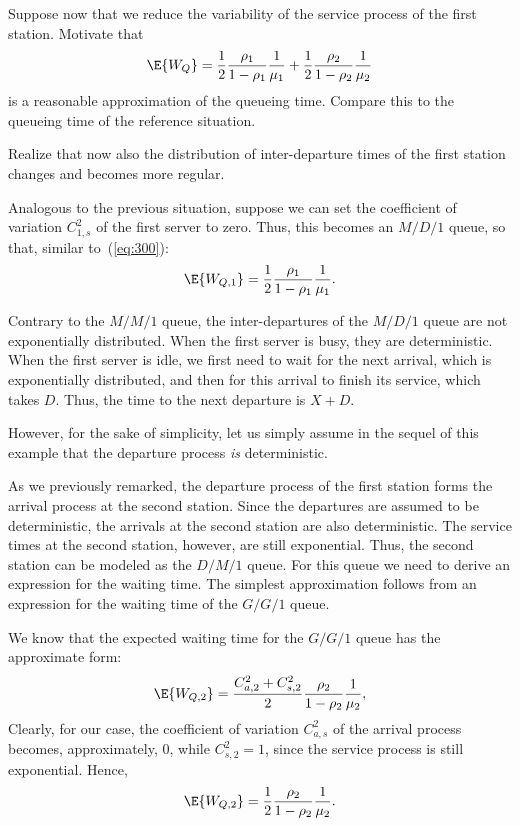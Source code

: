 \begin{exercise}
Suppose now that we reduce the variability of the service process of the first station.
Motivate that 
\begin{equation*}
  \E{W_Q}= \frac12\frac{\rho_1}{1-\rho_1} \frac1{\mu_1} +
  \frac12\frac{\rho_2}{1-\rho_2} \frac1{\mu_2}
\end{equation*}
is a reasonable approximation of the queueing time. Compare this to the queueing time of the reference situation.
  \begin{hint}
    Realize that now also the distribution of inter-departure times of the first station changes and becomes more regular.
  \end{hint}
  \begin{solution}
Analogous to the previous situation, suppose we can set the coefficient of variation
$C_{1,s}^2$ of the first server to zero. Thus, this becomes an $M/D/1$
queue, so that, similar to~(\ref{eq:300}):
\begin{equation*}
\E{W_{Q,1}} = \frac{1}2\frac{\rho_1}{1-\rho_1} \frac1{\mu_1}.
\end{equation*}

Contrary to the $M/M/1$ queue, the inter-departures of the $M/D/1$
queue are not exponentially distributed. When the first
server is busy, they are deterministic. When the first server is idle, we first
need to wait for the next arrival, which is exponentially distributed, and then for this arrival to finish its service, which
takes $D$. Thus, the time to the next departure is $X+D$.  

However, for the sake of simplicity, let us simply assume in the sequel of this
example that the departure process \emph{is} deterministic.

As we previously remarked, the departure process of the first station
forms the arrival process at the second station.  Since the departures
are assumed to be deterministic, the arrivals at the second station
are also deterministic.  The service times at the second station, however, are still
exponential.  Thus, the second station can be modeled as
the $D/M/1$ queue. For this queue we need to derive an expression for
the waiting time. The simplest approximation follows from an
expression for the waiting time of the $G/G/1$ queue.

We know that the expected waiting time for the $G/G/1$ queue has
the approximate form:
\begin{equation}\label{eq:500}
\E{W_{Q,2}} = \frac{C_{a,2}^2+C_{s,2}^2}2\frac{\rho_2}{1-\rho_2} \frac1{\mu_2},
\end{equation}
Clearly, for our case, the coefficient of  variation $C_{a,s}^2$ of the
arrival process becomes, approximately, $0$, while $C_{s,2}^2 = 1$,
since the service process is still exponential. Hence,
\begin{equation}\label{eq:400}
\E{W_{Q,2}} = \frac12\frac{\rho_2}{1-\rho_2} \frac1{\mu_2}.
\end{equation}


\end{solution}
\end{exercise}
